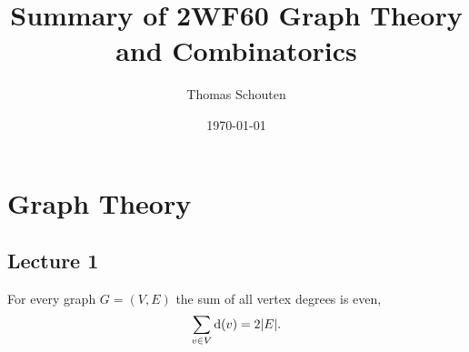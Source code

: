 \documentclass{report}
\title{Summary of 2WF60 Graph Theory and Combinatorics}
\author{Thomas Schouten}
\date{\today}
\begin{document}
    \maketitle
    \tableofcontents

    \chapter*{Graph Theory}\label{ch:graphTheory}

    \section{Lecture 1}\label{sec:lecture1}

    \begin{lemma}
        For every graph $G=(V,E)$ the sum of all vertex degrees is even,
        \[
            \sum_{v \in V} \mathop{}\!\mathrm{d}(v) = 2|E|.
        \]
    \end{lemma}
\end{document}

